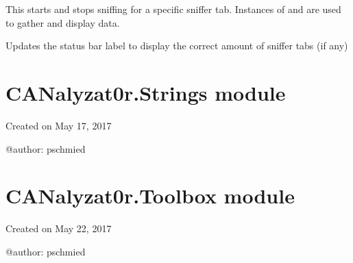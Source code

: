 \documentclass[letterpaper,10pt,english]{sphinxmanual}
\begin{document}
\begin{fulllineitems}
\begin{fulllineitems}
\end{fulllineitems}


\begin{fulllineitems}
\label{\detokenize{src:src.SnifferTabElement.SnifferTabElement.toggleSniffing}}
This starts and stops sniffing for a specific sniffer tab.
Instances of {\hyperref[\detokenize{src:src.ItemAdderThread.ItemAdderThread}]{}} and {\hyperref[\detokenize{src:src.SnifferProcess.SnifferProcess}]{}} are
used to gather and display data.

\end{fulllineitems}


\begin{fulllineitems}
\label{\detokenize{src:src.SnifferTabElement.SnifferTabElement.updateStatusBar}}
Updates the status bar label to display the correct amount of sniffer tabs (if any)

\end{fulllineitems}


\end{fulllineitems}



\section{CANalyzat0r.Strings module}
\label{\detokenize{src:module-src.Strings}}\label{\detokenize{src:canalyzat0r-strings-module}}
Created on May 17, 2017

@author: pschmied


\section{CANalyzat0r.Toolbox module}
\label{\detokenize{src:module-src.Toolbox}}\label{\detokenize{src:canalyzat0r-toolbox-module}}
Created on May 22, 2017

@author: pschmied
\end{document}
